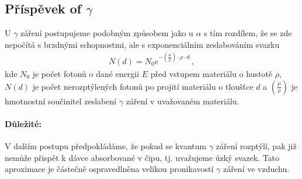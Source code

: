 \documentclass[11pt,a4paper]{article}
\begin{document}
\subsection{Příspěvek of $\gamma$}
U $\gamma$ záření postupujeme podobným způsobem jako u $\alpha$ s tím rozdílem, že se zde nepočítá s brzdnými schopnostmi, ale s exponenciálním zeslabováním svazku
\begin{align}
	N(d)=N_0e^{-\left(\frac{\mu}{\rho}\right)\cdot\rho\cdot d}\,,
\end{align}
kde $N_0$ je počet fotonů o dané energii $E$ před vstupem materiálu o hustotě $\rho$, $N(d)$ je počet nerozptýlených fotonů po projití materiálu o tloušťce $d$ a $\left(\frac{\mu}{\rho}\right)$ je hmotnostní součinitel zeslabení $\gamma$ záření v uvažovaném materiálu. 

\paragraph{Důležité:} V dalším postupu předpokládáme, že pokud se kvantum $\gamma$ záření rozptýlí, pak již nemůže přispět k dávce absorbované v čipu, tj. uvažujeme úzký svazek. Tato aproximace je částečně ospravedlněna velikou pronikavostí $\gamma$ záření ve vzduchu.
\end{document}
